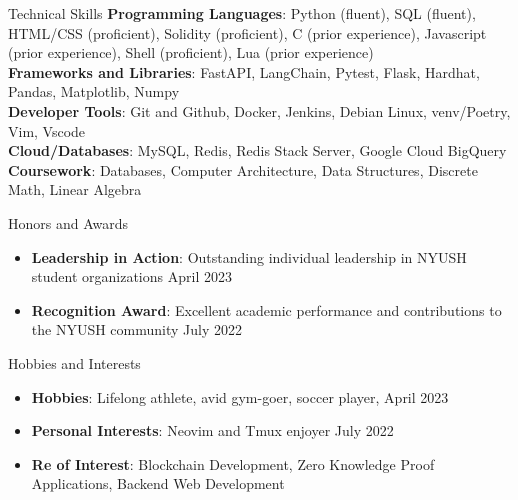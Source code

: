 \documentclass{cv} %
\begin{document}
\begin{rSection}{Technical Skills}
	\textbf{Programming Languages}{: Python (fluent), SQL (fluent), HTML/CSS (proficient), Solidity (proficient), C (prior experience),  Javascript (prior experience), Shell  (proficient), Lua (prior experience)} \\
	\textbf{Frameworks and Libraries}{: FastAPI, LangChain, Pytest, Flask, Hardhat, Pandas, Matplotlib, Numpy} \\
	\textbf{Developer Tools}{: Git and Github, Docker, Jenkins, Debian Linux, venv/Poetry, Vim, Vscode} \\
	\textbf{Cloud/Databases}{: MySQL, Redis, Redis Stack Server, Google Cloud BigQuery} \\
	\textbf{Coursework}{: Databases, Computer Architecture, Data Structures, Discrete Math, Linear Algebra}
\end{rSection}

\begin{rSection}{Honors and Awards}
	\begin{itemize}
		\item \textbf{Leadership in Action}{: Outstanding individual leadership in NYUSH student organizations} \hfill April 2023
		\item \textbf{Recognition Award}{: Excellent academic performance and contributions to the NYUSH community} \hfill July 2022
	\end{itemize}
\end{rSection}

\begin{rSection}{Hobbies and Interests}
	\begin{itemize}
		\item \textbf{Hobbies}{: Lifelong athlete, avid gym-goer, soccer player, } \hfill April 2023
		\item \textbf{Personal Interests}{: Neovim and Tmux enjoyer} \hfill July 2022
		\item \textbf{Re of Interest}{: Blockchain Development, Zero Knowledge Proof Applications, Backend Web Development}
	\end{itemize}
\end{rSection}
\end{document}
